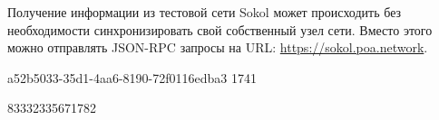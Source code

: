 Получение информации из тестовой сети Sokol может происходить без необходимости синхронизировать свой собственный узел сети. Вместо этого можно отправлять JSON-RPC запросы на URL: \url{https://sokol.poa.network}.

\begin{myverbbox}[\small]{\vinput} 
    a52b5033-35d1-4aa6-8190-72f0116edba3
    1741
\end{myverbbox}
\begin{myverbbox}[\small]{\voutput}
    83332335671782
\end{myverbbox}

